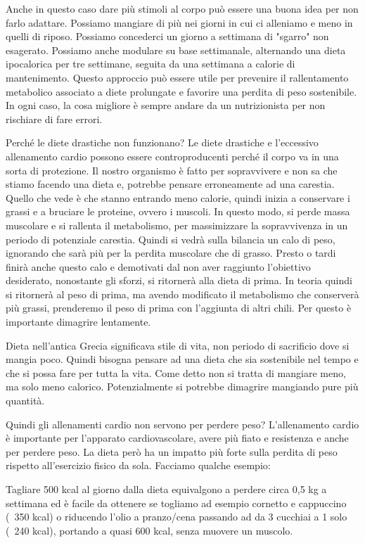 \documentclass[12pt]{book} %
\begin{document}
Anche in questo caso dare più stimoli al corpo può essere una buona idea per non farlo adattare. Possiamo mangiare di più nei giorni in cui ci alleniamo e meno in quelli di riposo. Possiamo concederci un giorno a settimana di "sgarro" non esagerato. Possiamo anche modulare su base settimanale, alternando una dieta ipocalorica per tre settimane, seguita da una settimana a calorie di mantenimento. Questo approccio può essere utile per prevenire il rallentamento metabolico associato a diete prolungate e favorire una perdita di peso sostenibile. In ogni caso, la cosa migliore è sempre andare da un nutrizionista per non rischiare di fare errori.

Perché le diete drastiche non funzionano?
Le diete drastiche e l'eccessivo allenamento cardio possono essere controproducenti perché il corpo va in una sorta di protezione. Il nostro organismo è fatto per sopravvivere e non sa che stiamo facendo una dieta e, potrebbe pensare erroneamente ad una carestia. Quello che vede è che stanno entrando meno calorie, quindi inizia a conservare i grassi e a bruciare le proteine, ovvero i muscoli. In questo modo, si perde massa muscolare e si rallenta il metabolismo, per massimizzare la sopravvivenza in un periodo di potenziale carestia. Quindi si vedrà sulla bilancia un calo di peso, ignorando che sarà più per la perdita muscolare che di grasso. Presto o tardi finirà anche questo calo e demotivati dal non aver raggiunto l'obiettivo desiderato, nonostante gli sforzi, si ritornerà alla dieta di prima. In teoria quindi si ritornerà al peso di prima, ma avendo modificato il metabolismo che conserverà più grassi, prenderemo il peso di prima con l'aggiunta di altri chili.
Per questo è importante dimagrire lentamente.

Dieta nell'antica Grecia significava stile di vita, non periodo di sacrificio dove si mangia poco. Quindi bisogna pensare ad una dieta che sia sostenibile nel tempo e che si possa fare per tutta la vita. Come detto non si tratta di mangiare meno, ma solo meno calorico. Potenzialmente si potrebbe dimagrire mangiando pure più quantità.

Quindi gli allenamenti cardio non servono per perdere peso?
L'allenamento cardio è importante per l'apparato cardiovascolare, avere più fiato e resistenza e anche per perdere peso. La dieta però ha un impatto più forte sulla perdita di peso rispetto all’esercizio fisico da sola. Facciamo qualche esempio:

Tagliare 500 kcal al giorno dalla dieta equivalgono a perdere circa 0,5 kg a settimana ed è facile da ottenere se togliamo ad esempio cornetto e cappuccino (~350 kcal) o riducendo l'olio a pranzo/cena passando ad da 3 cucchiai a 1 solo (~240 kcal), portando a quasi 600 kcal, senza muovere un muscolo.
\end{document}
